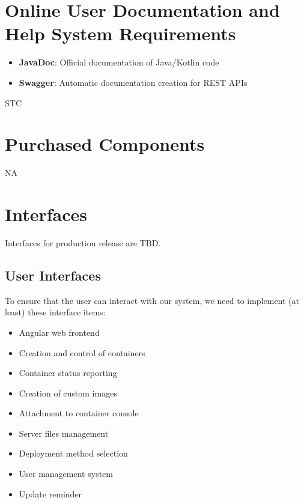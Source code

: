 \documentclass[a4paper,12pt,chapterprefix=false,bibliography=totoc,listof=totoc,]{scrreprt}
\newcommand{\gls}[1]{\uppercase{#1}}
\begin{document}
\section{Online User Documentation and Help System Requirements}
\begin{itemize}
	\item \textbf{JavaDoc}: Official documentation of Java/Kotlin code
	\item \textbf{Swagger}: Automatic documentation creation for REST APIs
\end{itemize}

\gls{stc}

\section{Purchased Components}
\gls{na}

\section{Interfaces}
Interfaces for production release are \gls{tbd}.

\subsection{User Interfaces}
To ensure that the user can interact with our system, we need to implement (at least) these interface items:
\begin{itemize}
	\item Angular web frontend
	\item Creation and control of containers
	\item Container status reporting
	\item Creation of custom images
	\item Attachment to container console
	\item Server files management
	\item Deployment method selection
	\item User management system
	\item Update reminder
\end{itemize}
\end{document}
